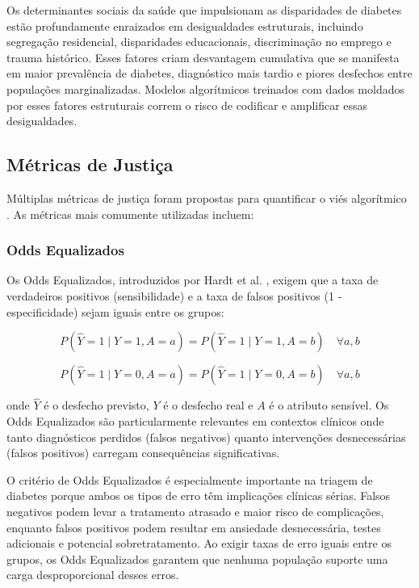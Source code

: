 Os determinantes sociais da saúde que impulsionam as disparidades de diabetes 
estão profundamente enraizados em desigualdades estruturais, incluindo 
segregação residencial, disparidades educacionais, discriminação no emprego 
e trauma histórico. Esses fatores criam desvantagem cumulativa que se 
manifesta em maior prevalência de diabetes, diagnóstico mais tardio e 
piores desfechos entre populações marginalizadas. Modelos algorítmicos 
treinados com dados moldados por esses fatores estruturais correm o risco 
de codificar e amplificar essas desigualdades.

\subsection{Métricas de Justiça}

Múltiplas métricas de justiça foram propostas para quantificar o viés 
algorítmico \cite{corbett2018}. As métricas mais comumente utilizadas 
incluem:

\subsubsection{Odds Equalizados}

Os Odds Equalizados, introduzidos por Hardt et al. \cite{hardt2016}, 
exigem que a taxa de verdadeiros positivos (sensibilidade) e a taxa de 
falsos positivos (1 - especificidade) sejam iguais entre os grupos:

\begin{equation}
P(\hat{Y}=1 \mid Y=1, A=a) = P(\hat{Y}=1 \mid Y=1, A=b) \quad \forall a,b
\label{eq:eo_tpr}
\end{equation}

\begin{equation}
P(\hat{Y}=1 \mid Y=0, A=a) = P(\hat{Y}=1 \mid Y=0, A=b) \quad \forall a,b
\label{eq:eo_fpr}
\end{equation}

\noindent onde $\hat{Y}$ é o desfecho previsto, $Y$ é o desfecho real 
e $A$ é o atributo sensível. Os Odds Equalizados são particularmente 
relevantes em contextos clínicos onde tanto diagnósticos perdidos (falsos 
negativos) quanto intervenções desnecessárias (falsos positivos) carregam 
consequências significativas.

O critério de Odds Equalizados é especialmente importante na triagem de 
diabetes porque ambos os tipos de erro têm implicações clínicas sérias. 
Falsos negativos podem levar a tratamento atrasado e maior risco de 
complicações, enquanto falsos positivos podem resultar em ansiedade 
desnecessária, testes adicionais e potencial sobretratamento. Ao exigir 
taxas de erro iguais entre os grupos, os Odds Equalizados garantem que 
nenhuma população suporte uma carga desproporcional desses erros.

